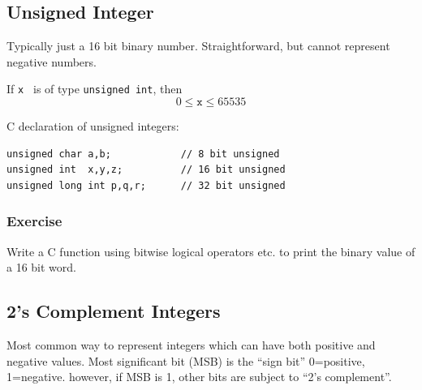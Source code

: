 \subsection{Unsigned Integer}

Typically just a
16 bit binary number.  Straightforward, but cannot represent
negative numbers.

If {\tt x } is of type {\tt unsigned int}, then
\[
0 \leq {\mathtt x} \leq 65535
\]



C declaration of unsigned integers:

\begin{verbatim}
unsigned char a,b;            // 8 bit unsigned
unsigned int  x,y,z;          // 16 bit unsigned
unsigned long int p,q,r;      // 32 bit unsigned
\end{verbatim}




\subsubsection{Exercise}

Write a C function using bitwise logical operators etc. to print
the binary value of a 16 bit word.

\vspace{4in}	%


%
%
%
%
\subsection{2's Complement Integers}
Most common way to represent integers which can have both positive and negative
values.   Most significant bit (MSB) is the ``sign bit'' 0=positive, 1=negative.
however, if MSB is 1, other bits are subject to ``2's complement''.
%
%

